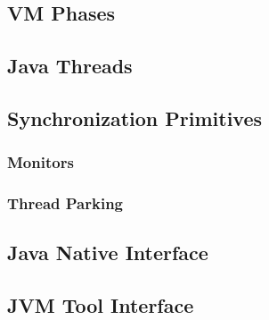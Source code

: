 
\subsection{VM Phases}


\subsection{Java Threads}



\subsection{Synchronization Primitives}



\subsubsection{Monitors}

\subsubsection{Thread Parking}

\subsection{Java Native Interface}


\subsection{JVM Tool Interface}




